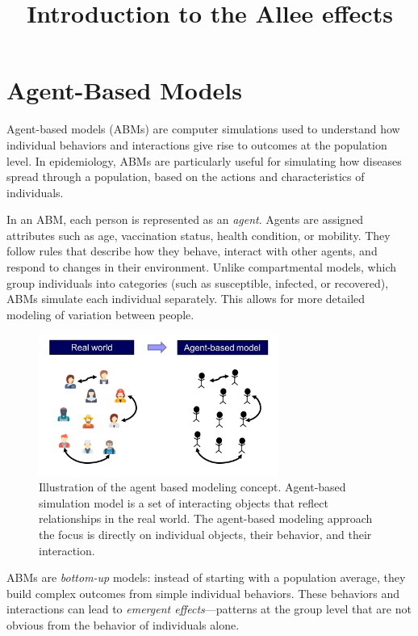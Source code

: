 \documentclass{article}
\title{Introduction to the Allee effects}
\begin{document}
\maketitle

\section{Agent-Based Models}

Agent-based models (ABMs) are computer simulations used to understand how individual behaviors and interactions give rise to outcomes at the population level. In epidemiology, ABMs are particularly useful for simulating how diseases spread through a population, based on the actions and characteristics of individuals.

In an ABM, each person is represented as an \emph{agent}. Agents are assigned attributes such as age, vaccination status, health condition, or mobility. They follow rules that describe how they behave, interact with other agents, and respond to changes in their environment. Unlike compartmental models, which group individuals into categories (such as susceptible, infected, or recovered), ABMs simulate each individual separately. This allows for more detailed modeling of variation between people.

\begin{figure}[htbp]
  \centering
  \includegraphics[width=0.7\textwidth]{projects/agent_based_modeling/images/agent-based-modelling.png}
  \caption{Illustration of the agent based modeling concept. Agent-based simulation model is a set of interacting objects that reflect relationships in the real world. The agent-based modeling approach the focus is directly on individual objects, their behavior, and their interaction.}
  \label{fig:allee-effects}
\end{figure}

ABMs are \emph{bottom-up} models: instead of starting with a population average, they build complex outcomes from simple individual behaviors. These behaviors and interactions can lead to \emph{emergent effects}---patterns at the group level that are not obvious from the behavior of individuals alone.
\end{document}
